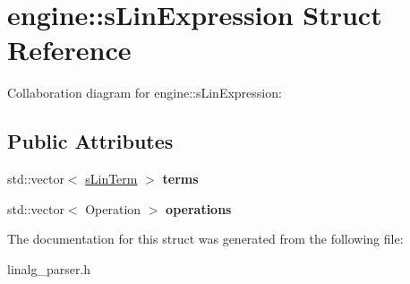 \hypertarget{structengine_1_1sLinExpression}{\section{engine\-:\-:s\-Lin\-Expression Struct Reference}
\label{structengine_1_1sLinExpression}
}


Collaboration diagram for engine\-:\-:s\-Lin\-Expression\-:
\subsection*{Public Attributes}
\begin{DoxyCompactItemize}
\item 
\hypertarget{structengine_1_1sLinExpression_a333f81c7cfd7de8274afe6d9274385c4}{std\-::vector$<$ \hyperlink{structengine_1_1sLinTerm}{s\-Lin\-Term} $>$ {\bfseries terms}}\label{structengine_1_1sLinExpression_a333f81c7cfd7de8274afe6d9274385c4}

\item 
\hypertarget{structengine_1_1sLinExpression_a03124741fe628efba92dc0f77a9161fe}{std\-::vector$<$ Operation $>$ {\bfseries operations}}\label{structengine_1_1sLinExpression_a03124741fe628efba92dc0f77a9161fe}

\end{DoxyCompactItemize}


The documentation for this struct was generated from the following file\-:\begin{DoxyCompactItemize}
\item 
linalg\-\_\-parser.\-h\end{DoxyCompactItemize}
